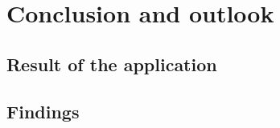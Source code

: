 %
% 
\chapter{Conclusion and outlook}
\label{cha6}

\section{Result of the application}

\section{Findings}

